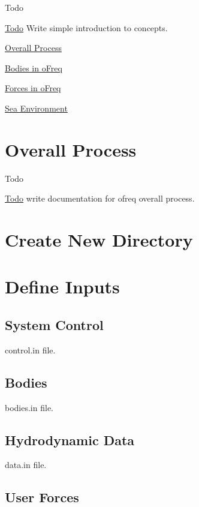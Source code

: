 \begin{DoxyRefDesc}{Todo}
\item[\hyperlink{todo__todo000005}{Todo}]Write simple introduction to concepts.\end{DoxyRefDesc}


\hyperlink{concept_overall}{Overall Process}

\hyperlink{concept_bodies}{Bodies in o\-Freq}

\hyperlink{concept_forces}{Forces in o\-Freq}

\hyperlink{concept_seaenv}{Sea Environment} \hypertarget{concept_overall}{}\section{Overall Process}\label{concept_overall}
\begin{DoxyRefDesc}{Todo}
\item[\hyperlink{todo__todo000003}{Todo}]write documentation for ofreq overall process.\end{DoxyRefDesc}


\section*{Create New Directory}

\section*{Define Inputs}

\subsection*{System Control}

control.\-in file.

\subsection*{Bodies}

bodies.\-in file.

\subsection*{Hydrodynamic Data}

data.\-in file.

\subsection*{User Forces}

